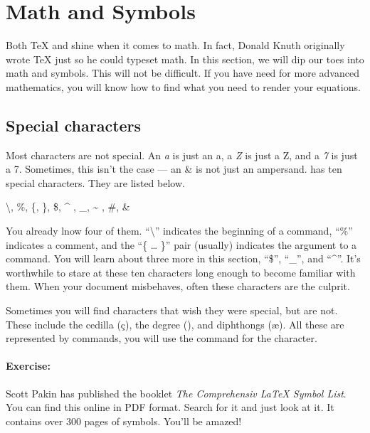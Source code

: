     \section{Math and Symbols}
    \label{Math}

	Both \TeX{} and \Lx{} shine when it comes to math. In fact, Donald Knuth originally wrote \TeX{} just so he could typeset math. In this section, we will dip our toes into math and symbols. This will not be difficult. If you have need for more advanced mathematics, you will know how to find what you need to render your equations.

        \subsection{Special characters}
        \label{Special-characters}
        
		Most characters are not special. An \textit{a} is just an a, a \textit{Z} is just a Z, and a \textit{7} is just a 7. Sometimes, this isn't the case --- an \&  is not just an ampersand. \Lx{} has ten special characters. They are listed below.

        \begin{framed}
			\textbackslash, \%, \{, \}, \$, \^{} , \_, \~{} , \#, \&
            \index{\textbackslash}
            \index{\%}
            \index{\{\}}
            \index{\$}
            \index{\^{}}
            \index{\_}
            \index{\#}
            \index{\&}
        \end{framed}

        You already lnow four of them. ``\textbackslash'' indicates the beginning of a command, ``\%'' indicates a comment, and the ``\{ \ldots{} \}'' pair (usually) indicates the argument to a command. You will learn about three more in this section, ``\$'', ``\_'', and ``\^{}''. It's worthwhile to stare at these ten characters long enough to become familiar with them. When your document misbehaves, often these characters are the culprit.

		Sometimes you will find characters that wish they were special, but are not. These include the cedilla (\c{c}), the degree (\textdegree), and diphthongs (\ae). All these are represented by \Lx{} commands, you will use the command for the character.

		\paragraph{Exercise:}Scott Pakin has published the booklet \textit{The Comprehensiv \LaTeX{} Symbol List}. You can find this online in PDF format. Search for it and just look at it. It contains over 300 pages of symbols. You'll be amazed! 

